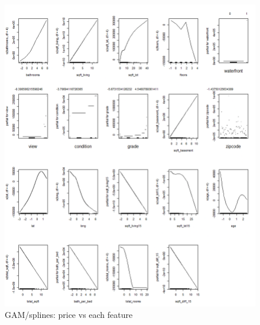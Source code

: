 \documentclass[a4paper, 11pt]{article}
\begin{document}
\begin{figure}[H]
\includegraphics[scale=0.5]{gam}
\centering
\caption{GAM/splines: price vs each feature}
\label{fig:gam}
\end{figure}
\end{document}
